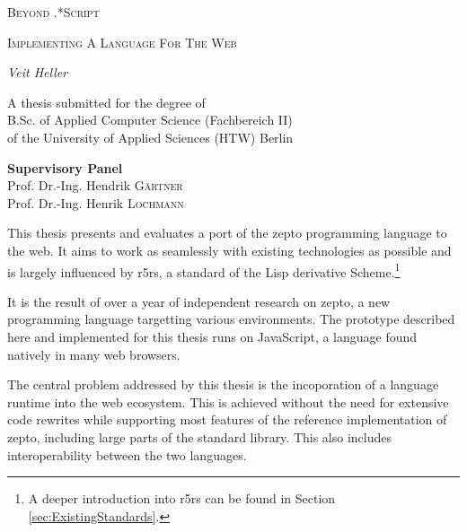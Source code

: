 \documentclass[oneside,11pt,xetex]{scrbook}
\begin{document}
\begin{titlepage}
	\centering
	{\scshape\LARGE Beyond .*Script \par}
	\vspace{1cm}
	{\scshape\Large Implementing A Language For The Web\par}
	\vspace{2cm}
	{\Large\itshape Veit Heller\par}
	\vfill
  A thesis submitted for the degree of \\
  B.Sc. of Applied Computer Science (Fachbereich II) \\
  of the University of Applied Sciences (HTW) Berlin
	\vfill

  \textbf{Supervisory Panel}\\

  Prof. Dr.-Ing. Hendrik \textsc{Gärtner}\\

  Prof. Dr.-Ing. Henrik \textsc{Lochmann}\\
	\vfill

\end{titlepage}

\dedication{\small{\emph{For Meredith, Tobias and all the people who cope with me. Your undying support will not be forgotten.}}}


\frontmatter


This thesis presents and evaluates a port of the zepto programming language to the web. It aims to
work as seamlessly with existing technologies as possible and is largely influenced by \gls{r5rs},
a standard of the Lisp derivative Scheme.\footnote{A deeper introduction into \gls{r5rs} can be found
in Section \ref{sec:ExistingStandards}.}

It is the result of over a year of independent research on zepto, a new programming language
targetting various environments. The prototype described here and implemented for this
thesis runs on JavaScript, a language found natively in many web browsers.

The central problem addressed by this thesis is the incoporation of a language runtime
into the web ecosystem. This is achieved without the need for extensive code rewrites
while supporting most features of the reference implementation of zepto, including large
parts of the standard library. This also includes interoperability between the two languages.
\end{document}
